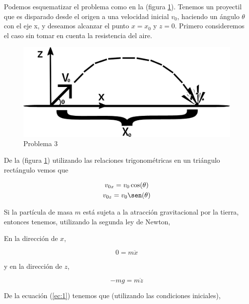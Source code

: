 \documentclass[a4paper,10pt]{article}
\begin{document}
\vspace{.3cm}

Podemos esquematizar el problema como en la (figura \ref{fig:problema3}). 
Tenemos un proyectil que es disparado desde el origen a una velocidad 
inicial $v_0$, haciendo un ángulo $\theta$ con el eje x, y deseamos
alcanzar el punto $x=x_0$ y $z=0$. Primero consideremos el caso sin
tomar en cuenta la resistencia del aire.

\begin{figure}[ht]
 \centering
\includegraphics[scale=0.3]{problema3fig1}
\caption{Problema 3}
\label{fig:problema3}
\end{figure}

\vspace{.3cm}

De la (figura \ref{fig:problema3}) utilizando las relaciones trigonométricas en un 
triángulo rectángulo vemos que

\begin{gather*}
v_{0x} = v_0\cos(\theta) \\
v_{0z} = v_0\sen(\theta)
\end{gather*}


Si la partícula de masa $m$ está sujeta a la atracción gravitacional
por la tierra, entonces tenemos, utilizando la segunda ley de Newton,

\vspace{.3cm}

En la dirección de $x$,

\begin{equation}
 0 = m \ddot{x}
 \label{ec:1}
\end{equation}

y en la dirección de $z$,

\begin{equation}
 - mg = m \ddot{z}
  \label{ec:2}
\end{equation}

De la ecuación (\ref{ec:1}) tenemos que (utilizando las condiciones iniciales),
\end{document}
